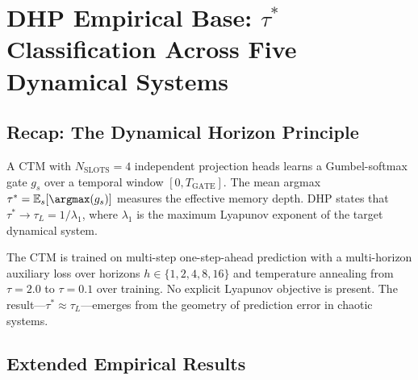 \documentclass[12pt]{article}
\begin{document}
\section{DHP Empirical Base: $\tau^*$ Classification Across Five Dynamical Systems}
\label{sec:empirical}

\subsection{Recap: The Dynamical Horizon Principle}

A CTM with $N_{\text{SLOTS}}=4$ independent projection heads learns a Gumbel-softmax
gate $g_s$ over a temporal window $[0, T_{\text{GATE}}]$. The mean argmax
$\tau^* = \mathbb{E}_s[\argmax(g_s)]$ measures the effective memory depth. DHP states
that $\tau^* \to \tau_L = 1/\lambda_1$, where $\lambda_1$ is the maximum Lyapunov
exponent of the target dynamical system.

The CTM is trained on multi-step one-step-ahead prediction with a multi-horizon auxiliary
loss over horizons $h \in \{1,2,4,8,16\}$ and temperature annealing from $\tau=2.0$ to
$\tau=0.1$ over training. No explicit Lyapunov objective is present. The result---$\tau^*
\approx \tau_L$---emerges from the geometry of prediction error in chaotic systems.

\subsection{Extended Empirical Results}
\end{document}
